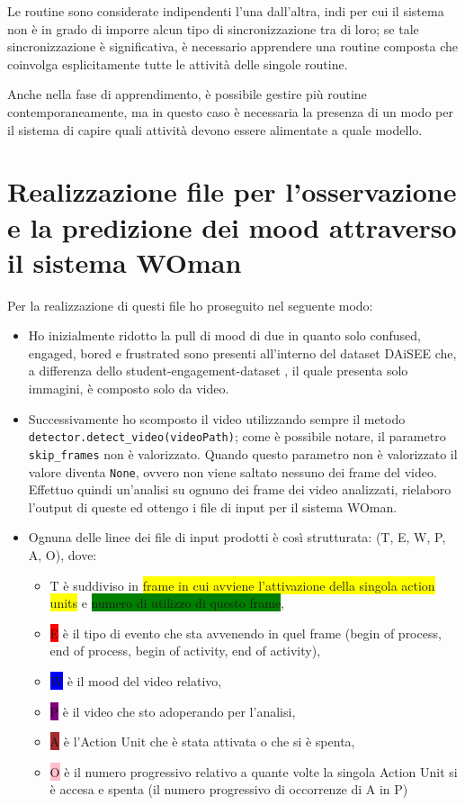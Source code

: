 Le routine sono considerate indipendenti l'una dall'altra, indi per cui il sistema non è in grado di imporre alcun tipo di sincronizzazione tra di loro; se tale sincronizzazione è significativa, è necessario apprendere una routine composta che coinvolga esplicitamente tutte le attività delle singole routine. 

Anche nella fase di apprendimento, è possibile gestire più routine contemporaneamente, ma in questo caso è necessaria la presenza di un modo per il sistema di capire quali attività devono essere alimentate a quale modello.

\section{Realizzazione file per l’osservazione e la predizione dei mood attraverso il sistema WOman}

Per la realizzazione di questi file ho proseguito nel seguente modo:
\begin{itemize}
    \item Ho inizialmente ridotto la pull di mood di due in quanto solo confused, engaged, bored e frustrated sono presenti all’interno del dataset DAiSEE \cite{DAiSEE} che, a differenza dello student-engagement-dataset \cite{StudEngagDataset}, il quale presenta solo immagini, è composto solo da video.
    \item Successivamente ho scomposto il video utilizzando sempre il metodo \texttt{detector.detect_video(videoPath)}; come è possibile notare, il parametro \texttt{skip_frames} non è valorizzato. Quando questo parametro non è valorizzato il valore diventa \texttt{None}, ovvero non viene saltato nessuno dei frame del video.
    Effettuo quindi un’analisi su ognuno dei frame dei video analizzati, rielaboro l’output di queste ed ottengo i file di input per il sistema WOman.
    \item Ognuna delle linee dei file di input prodotti è così strutturata: (T, E, W, P, A, O), dove: 
    \begin{itemize}
        \item T è suddiviso in \colorbox{yellow}{frame in cui avviene l'attivazione della singola action} \colorbox{yellow}{units} e \colorbox{green}{numero di utilizzo di questo frame},
        \item \colorbox{red}{E} è il tipo di evento che sta avvenendo in quel frame (begin of process, end of process, begin of activity, end of activity), 
        \item \colorbox{blue}{W} è il mood del video relativo,
        \item \colorbox{purple}{P} è il video che sto adoperando per l’analisi, 
        \item \colorbox{brown}{A} è l’Action Unit che è stata attivata o che si è spenta,
        \item \colorbox{pink}{O} è il numero progressivo relativo a quante volte la singola Action Unit si è accesa e spenta (il numero progressivo di occorrenze di A in P) 
    \end{itemize}
\end{itemize}

